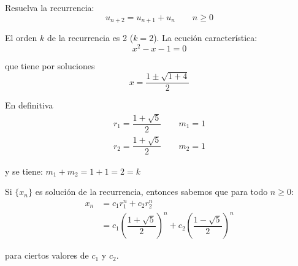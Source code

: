 \begin{ejercicio}\label{ej:recurrencia}
    Resuelva la recurrencia:
    \begin{equation*}
        u_{n+2} = u_{n+1} + u_n\qquad n\geq 0
    \end{equation*}

    El orden $k$ de la recurrencia es 2 ($k = 2$). La ecución característica:
    \begin{equation*}
        x^2 -x -1 = 0 
    \end{equation*}

    que tiene por soluciones
    \begin{equation*}
        x = \dfrac{1\pm \sqrt{1+4}}{2} 
    \end{equation*}

    En definitiva
    \begin{gather*}
        r_1 = \dfrac{1+\sqrt{5}}{2} \qquad m_1 = 1 \\
        r_2 = \dfrac{1+\sqrt{5}}{2} \qquad m_2 = 1
    \end{gather*}

    y se tiene: $m_1+m_2 = 1 +1 = 2 = k$

    Si $\{x_n\}$ es solución de la recurrencia, entonces sabemos que para todo $n \geq 0$:
    \begin{align*}
        x_n &= c_1 r_1^n + c_2 r_2^n\\
            &= c_1{\left(\dfrac{1+\sqrt{5}}{2}\right)}^n + c_2 {\left(\dfrac{1-\sqrt{5}}{2}\right)}^n
    \end{align*}

    para ciertos valores de $c_1$ y $c_2$.
\end{ejercicio}

